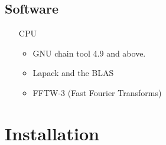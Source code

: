 \documentclass[review]{elsarticle}
\begin{document}
\subsection{Software}
\label{soft}
\begin{itemize}
\item [CPU]
  \begin{itemize}
  \item GNU chain tool 4.9 and above.
  \item Lapack and the BLAS
  \item FFTW-3 (Fast Fourier Transforms)
  \end{itemize}
\end{itemize}

\section{Installation}
\label{install}
\end{document}
